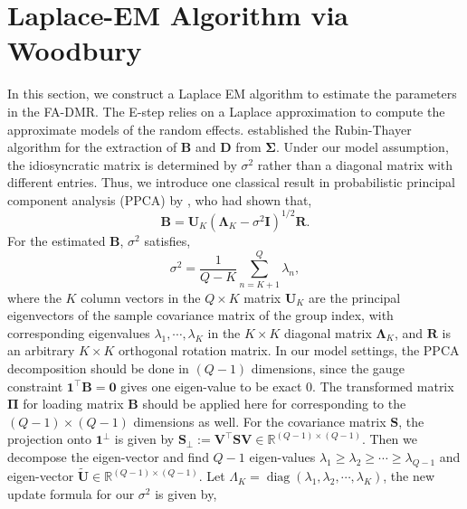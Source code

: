 \section{Laplace-EM Algorithm via Woodbury}
\label{sec: EM-wb}

In this section, we construct a Laplace EM algorithm to estimate the parameters in the FA-DMR. The E-step relies on a Laplace approximation to compute the approximate models of the random effects. \citet{Rubin1982} established the Rubin-Thayer algorithm for the extraction of $\mathbf{B}$ and $\mathbf{D}$ from $\bm{\Sigma}$. Under our model assumption, the idiosyncratic matrix is determined by $\sigma^{2}$ rather than a diagonal matrix with different entries.
Thus, we introduce one classical result in probabilistic principal component analysis (PPCA) by \citet{Tipping1999}, who had shown that,
\begin{equation}
    \mathbf{B}=\mathbf{U}_{K}\left(\bm{\Lambda}_{K}-\sigma^{2}\mathbf{I}\right)^{1/2}\mathbf{R}.
    \label{eq:tipping-ppca_b}
\end{equation}
For the estimated $\mathbf{B}$, $\sigma^{2}$ satisfies,
\begin{equation}
    \sigma^{2}=\frac{1}{Q-K}\sum_{n=K+1}^{Q}\lambda_{n},
    \label{eq:tipping-ppca_sigma}
\end{equation}
where the $K$ column vectors in the $Q\times K$ matrix $\mathbf{U}_{K}$ are the principal eigenvectors of the sample covariance matrix of the group index, with corresponding eigenvalues $\lambda_{1},\cdots,\lambda_{K}$ in the $K\times K$ diagonal matrix $\bm{\Lambda}_{K}$, and $\mathbf{R}$ is an arbitrary $K\times K$ orthogonal rotation matrix.
In our model settings, the PPCA decomposition should be done in $(Q-1)$ dimensions, since the gauge constraint $\mathbf{1}^{\top}\mathbf{B}=\bm{0}$ gives one eigen-value to be exact 0. The transformed matrix $\bm{\Pi}$ for loading matrix $\mathbf{B}$ should be applied here for corresponding to the $(Q-1)\times (Q-1)$ dimensions as well. For the covariance matrix $\mathbf{S}$, the projection onto $\mathbf{1}^{\perp}$ is given by $\mathbf{S}_{\perp}:=\mathbf{V}^{\top}\mathbf{S}\mathbf{V}\in \mathbb{R}^{(Q-1)\times (Q-1)}$. Then we decompose the eigen-vector and find $Q-1$ eigen-values $\lambda_{1}\geq \lambda_{2}\geq \cdots\geq \lambda_{Q-1}$ and eigen-vector $\tilde{\mathbf{U}}\in \mathbb{R}^{(Q-1)\times (Q-1)}$. Let $\Lambda_{K}=\operatorname{diag}\left(\lambda_{1},\lambda_{2}, \cdots,\lambda_{K}\right)$, the new update formula for our $\sigma^{2}$ is given by,
